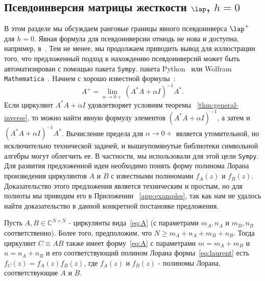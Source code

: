 \subsection{Псевдоинверсия матрицы жесткости $\lap$, $h=0$}\label{sec:pseudo}

%
В этом разделе мы обсуждаем ранговые границы явного псевдоинверса $\lap^+$ для $h=0$.
Явная формула для псевдоинверсии отнюдь не нова и доступна, например, в~\cite{plonka2016pseudo}.
Тем не менее, мы продолжаем приводить вывод для иллюстрации того, что предложенный подход к нахождению псевдоинверсий может быть автоматизирован с помощью пакета \texttt{Sympy}. пакета Python~\cite{sympy} или Wolfram \texttt{Mathematica}~\cite{Mathematica}.
Начнем с хорошо известной формулы~\cite{golub2013matrix}:
\begin{equation}\label{eq:pseudoinverse-lim}
A^+ = \lim_{\alpha \to 0+} (A^*A + \alpha I)^{-1}A^*.
\end{equation}
%
Если циркулянт $A^*A + \alpha I$ удовлетворяет условиям теоремы ~\ref{thm:general-inverse}, то можно найти явную формулу элементов $(A^*A + \alpha I)^{-1}$, а затем и $(A^*A + \alpha I)^{-1}A^*$.
Вычисление предела для $\alpha \to 0+$ является утомительной, но исключительно технической задачей, и вышеупомянутые библиотеки символьной алгебры могут облегчить ее. %
В частности, мы использовали для этой цели \texttt{Sympy}.
Для развития предложенной идеи необходимо понять форму полинома Лорана произведения циркулянтов $A$ и $B$ с известными полиномами $f_A(z)$ и $f_B(z)$. Доказательство этого предложения является техническим и простым, но для полноты мы приводим его в Приложении ~\ref{app:examples}, так как нам не удалось найти доказательство в данной конкретной постановке предложения.
\begin{proposition}\label{prop:laur_prod}
	Пусть $A,B \in \mathbb{C}^{N \times N}$ - циркулянты вида~\eqref{eq:A} (с параметрами $m_A, n_A$ и $m_B, n_B$ соответственно).
	Более того, предположим, что $N \ge m_A+n_A+m_B+n_B$.
	Тогда циркулянт $C \equiv AB$ также имеет форму~\eqref{eq:A} с параметрами $m = m_A + m_B$ и $n = n_A+n_B$ и его соответствующий полином Лорана формы~\eqref{eq:laurent} есть $f_C(z) = f_A(z)f_B(z)$, где $f_A(z)$ и $f_B(z)$ - полиномы Лорана, соответствующие $A$ и $B$.
\end{proposition}
